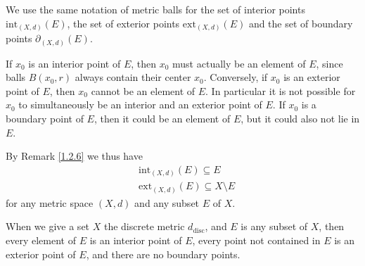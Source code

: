 \begin{note}
    We use the same notation of metric balls for the set of interior points \(\text{int}_{(X, d)}(E)\), the set of exterior points \(\text{ext}_{(X, d)}(E)\) and the set of boundary points \(\partial_{(X, d)}(E)\).
\end{note}

\begin{remark}\label{1.2.6}
    If \(x_0\) is an interior point of \(E\), then \(x_0\) must actually be an element of \(E\), since balls \(B(x_0, r)\) always contain their center \(x_0\).
    Conversely, if \(x_0\) is an exterior point of \(E\), then \(x_0\) cannot be an element of \(E\).
    In particular it is not possible for \(x_0\) to simultaneously be an interior and an exterior point of \(E\).
    If \(x_0\) is a boundary point of \(E\), then it could be an element of \(E\), but it could also not lie in \(E\).
\end{remark}

\begin{note}
    By Remark \ref{1.2.6} we thus have
    \begin{align*}
         & \text{int}_{(X, d)}(E) \subseteq E             \\
         & \text{ext}_{(X, d)}(E) \subseteq X \setminus E
    \end{align*}
    for any metric space \((X, d)\) and any subset \(E\) of \(X\).
\end{note}

\setcounter{theorem}{7}
\begin{example}\label{1.2.8}
    When we give a set \(X\) the discrete metric \(d_{\text{disc}}\), and \(E\) is any subset of \(X\), then every element of \(E\) is an interior point of \(E\), every point not contained in \(E\) is an exterior point of \(E\), and there are no boundary points.
\end{example}

